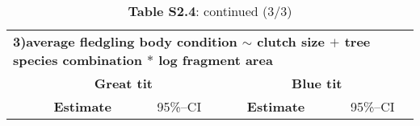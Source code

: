 \documentclass[10pt, twoside]{book} %
\begin{document}
\begin{landscape}
\begin{table}
\begin{center}
\begin{footnotesize}
\begin{tabular}{l c c c c cc}
					\bottomrule
				\end{tabular}\endgroup
			\end{footnotesize}
		\end{center}
	\end{table}
\end{landscape}
\clearpage

\clearpage
\thispagestyle{plain}
\begin{landscape}
	\begin{table}
		\begin{center}
			\begin{footnotesize}
				\caption*{\textbf{Table S2.4}: continued (3/3)}
				
				\begingroup
				\setlength{\tabcolsep}{10pt} %
				\renewcommand{\arraystretch}{1.5} %
				\begin{tabular}{l c c c c cc}
					\toprule
					\multicolumn{7}{l}{\textbf{3)average fledgling body condition  $\sim$ clutch size $+$ tree species combination $\ast$ log fragment area}}\\
					& \multicolumn{3}{c}{\textbf{Great tit}} & \multicolumn{3}{c}{\textbf{Blue tit}}\\
					\cmidrule(lr){2-4}\cmidrule(lr){5-7}
					
					& \textbf{Estimate} & \multicolumn{2}{c}{95\%--CI} & \textbf{Estimate} & \multicolumn{2}{c}{95\%--CI} \\
					\cmidrule(lr){2-7}
					

\end{tabular}
\end{footnotesize}
\end{center}
\end{table}
\end{landscape}
\end{document}
